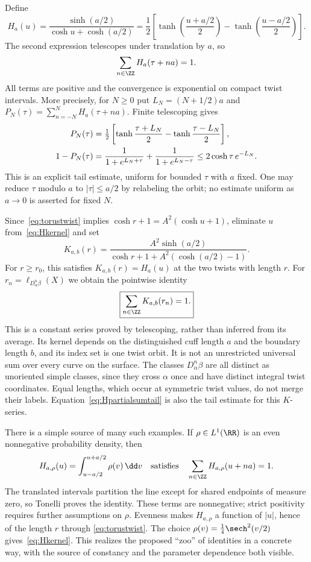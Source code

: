 Define
\begin{equation}
 H_a(u)=\frac{\sinh(a/2)}{\cosh u+\cosh(a/2)}
 =\frac12\left[
 \tanh\left(\frac{u+a/2}{2}\right)
 -\tanh\left(\frac{u-a/2}{2}\right)\right].
 \label{eq:Hkernel}
\end{equation}
The second expression telescopes under translation by $a$, so
\begin{equation}
 \sum_{n\in\ZZ}H_a(\tau+na)=1.
 \label{eq:Hidentity}
\end{equation}
All terms are positive and the convergence is exponential on compact
twist intervals.
More precisely, for $N\geq0$ put $L_N=(N+1/2)a$ and
$P_N(\tau)=\sum_{n=-N}^NH_a(\tau+na)$. Finite telescoping gives
\begin{align}
 P_N(\tau)&=\tfrac12\left[
    \tanh\frac{\tau+L_N}{2}-\tanh\frac{\tau-L_N}{2}\right],\notag\\
 1-P_N(\tau)&=\frac1{1+e^{L_N+\tau}}+
               \frac1{1+e^{L_N-\tau}}
       \leq2\cosh\tau\,e^{-L_N}.
 \label{eq:Hpartialsumtail}
\end{align}
This is an explicit tail estimate, uniform for bounded $\tau$ with $a$
fixed. One may reduce $\tau$ modulo $a$ to $|\tau|\leq a/2$ by relabeling
the orbit; no estimate uniform as $a\to0$ is asserted for fixed $N$.

Since~\eqref{eq:torustwist} implies
$\cosh r+1=A^2(\cosh u+1)$, eliminate $u$ from~\eqref{eq:Hkernel} and set
\begin{equation}
 K_{a,b}(r)=
 \frac{A^2\sinh(a/2)}
      {\cosh r+1+A^2(\cosh(a/2)-1)}.
 \label{eq:Kkernel}
\end{equation}
For $r\geq r_0$, this satisfies $K_{a,b}(r)=H_a(u)$ at the two twists
with length $r$. For $r_n=\ell_{D_\alpha^n\beta}(X)$ we obtain the pointwise identity
\begin{equation}
 \boxed{\sum_{n\in\ZZ}K_{a,b}(r_n)=1.}
 \label{eq:Kidentity}
\end{equation}
This is a constant series proved by telescoping, rather than inferred from
its average. Its kernel depends on the distinguished cuff length $a$ and
the boundary length $b$, and its index set is one twist orbit. It is not
an unrestricted universal sum over every curve on the surface.
The classes $D_\alpha^n\beta$ are all distinct as unoriented simple
classes, since they cross $\alpha$ once and have distinct integral twist
coordinates. Equal lengths, which occur at symmetric twist values, do
not merge their labels. Equation~\eqref{eq:Hpartialsumtail} is also the
tail estimate for this $K$-series.

There is a simple source of many such examples. If $\rho\in L^1(\RR)$
is an even nonnegative probability density, then
\[
 H_{a,\rho}(u)=\int_{u-a/2}^{u+a/2}\rho(v)\,\dd v
 \quad\text{satisfies}\quad
 \sum_{n\in\ZZ}H_{a,\rho}(u+na)=1.
\]
The translated intervals partition the line except for shared endpoints
of measure zero, so Tonelli proves the identity. These terms are
nonnegative; strict positivity requires further assumptions on $\rho$.
Evenness makes
$H_{a,\rho}$ a function of $|u|$, hence of the length $r$ through
\eqref{eq:torustwist}. The choice
$\rho(v)=\frac14\sech^2(v/2)$ gives~\eqref{eq:Hkernel}.
This realizes the proposed ``zoo'' of identities in a concrete way, with
the source of constancy and the parameter dependence both visible.
